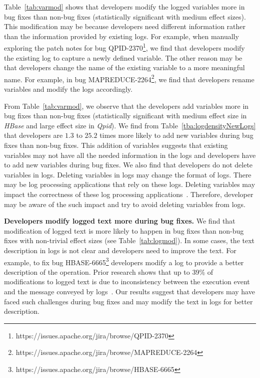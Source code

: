 Table~\ref{tab:varmod} shows that developers modify the logged variables more in bug fixes than non-bug fixes (statistically significant with medium effect sizes). This modification may be because developers need different information rather than the information provided by existing logs. For example, when manually exploring the patch notes for bug QPID-2370\footnote{https://issues.apache.org/jira/browse/QPID-2370}, we find that developers modify the existing log to capture a newly defined variable. The other reason may be that developers change the name of the existing variable to a more meaningful name. For example, in bug MAPREDUCE-2264\footnote{https://issues.apache.org/jira/browse/MAPREDUCE-2264}, we find that developers rename variables and modify the logs accordingly. %

From Table~\ref{tab:varmod}, we observe that the developers add variables more in bug fixes than non-bug fixes (statistically significant with medium effect size in \emph{HBase} and large effect size in \emph{Qpid}). We find from Table~\ref{tba:logdensityNewLogs} that developers are $1.3$ to $25.2$ times more likely to add new variables during bug fixes than non-bug fixes. This addition of variables suggests that existing variables may not have all the needed information in the logs and developers have to add new variables during bug fixes. We also find that developers do not delete variables in logs. Deleting variables in logs may change the format of logs. There may be log processing applications that rely on these logs. Deleting variables may impact the correctness of these log processing applications~\cite{IanWCRE}. Therefore, developer may be aware of the such impact and try to avoid deleting variables from logs.
 
 
\textbf{Developers modify logged text more during bug fixes.} We find that modification of logged text is more likely to happen in bug fixes than non-bug fixes with non-trivial effect sizes (see Table~\ref{tab:logmod}). In some cases, the text description in logs is not clear and developers need to improve the text. For example, to fix bug HBASE-6665\footnote{https://issues.apache.org/jira/browse/HBASE-6665} developers modify a log to provide a better description of the operation. Prior research shows that up to 39\% of modifications to logged text is due to inconsistency between the execution event and the message conveyed by logs~\cite{Characterizinglogs}. Our results suggest that developers may have faced such challenges during bug fixes and may modify the text in logs for better description. 

